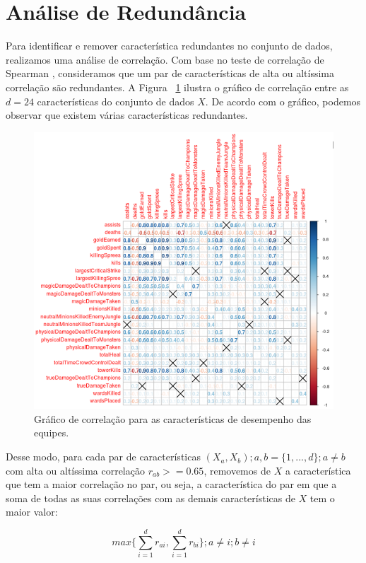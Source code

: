 \section{Análise de Redundância}

Para identificar e remover característica redundantes no conjunto de dados, realizamos uma análise de correlação. Com base no teste de correlação de Spearman \cite{xiao2015using}, consideramos que um par de características de alta ou altíssima correlação são redundantes. A Figura ~\ref{fig:correlations} ilustra o gráfico de correlação entre as $d=24$ características do conjunto de dados $X$. De acordo com o gráfico, podemos observar que existem várias características redundantes.

\begin{figure}
  \centering
  \includegraphics[width=1.0\textwidth]{correlations}%
  \caption{Gráfico de correlação para as características de desempenho das equipes.}
  \label{fig:correlations}
\end{figure}

Desse modo, para cada par de características $(X_a, X_b); a, b=\{1, ..., d\};a \neq b$ com alta ou altíssima correlação $r_{ab} >= 0.65$, removemos de $X$ a característica que tem a maior correlação no par, ou seja, a característica do par em que a soma de todas as suas correlações com as demais características de $X$ tem o maior valor:

\begin{displaymath}
  max \big\{ \sum_{i=1}^{d} r_{ai} ,  \sum_{i=1}^{d} r_{bi} \big\}; a \neq i; b \neq i
\end{displaymath}

